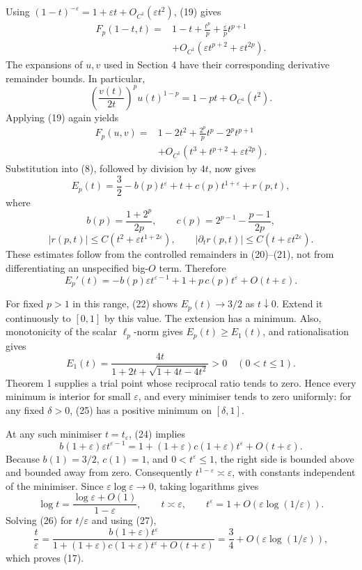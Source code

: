 \documentclass[11pt,a4paper]{article}
\begin{document}
Using \((1-t)^{-\varepsilon}=1+\varepsilon t+O_{C^1}(\varepsilon t^2)\), (19) gives \[
\begin{split}
F_p(1-t,t)
={}&1-t+\frac{t^p}p+\frac{\varepsilon}p t^{p+1}\\
&+O_{C^1}(\varepsilon t^{p+2}+\varepsilon t^{2p}).
\end{split} \tag{20}
\] The expansions of \(u,v\) used in Section 4 have their corresponding derivative remainder bounds. In particular, \[
\left(\frac{v(t)}{2t}\right)^p u(t)^{1-p}
=1-pt+O_{C^1}(t^2).
\] Applying (19) again yields \[
\begin{split}
F_p(u,v)
={}&1-2t^2+\frac{2^p}p t^p-2^p t^{p+1}\\
&+O_{C^1}(t^3+t^{p+2}+\varepsilon t^{2p}).
\end{split} \tag{21}
\] Substitution into (8), followed by division by \(4t\), now gives \[
E_p(t)=\frac32-b(p)t^\varepsilon+t+c(p)t^{1+\varepsilon}+r(p,t), \tag{22}
\] where \[
b(p)=\frac{1+2^p}{2p},\qquad c(p)=2^{p-1}-\frac{p-1}{2p},
\] \[
|r(p,t)|\le C(t^2+\varepsilon t^{1+2\varepsilon}),\qquad
|\partial_t r(p,t)|\le C(t+\varepsilon t^{2\varepsilon}). \tag{23}
\] These estimates follow from the controlled remainders in (20)--(21), not from differentiating an unspecified big-\(O\) term. Therefore \[
E_p'(t)=-b(p)\varepsilon t^{\varepsilon-1}
+1+p\,c(p)t^\varepsilon+O(t+\varepsilon). \tag{24}
\]

For fixed \(p>1\) in this range, (22) shows \(E_p(t)\to3/2\) as \(t\downarrow0\). Extend it continuously to \([0,1]\) by this value. The extension has a minimum. Also, monotonicity of the scalar \(\ell_p\)-norm gives \(E_p(t)\ge E_1(t)\), and rationalisation gives \[
E_1(t)=\frac{4t}{1+2t+\sqrt{1+4t-4t^2}}>0\quad(0<t\le1). \tag{25}
\] Theorem 1 supplies a trial point whose reciprocal ratio tends to zero. Hence every minimum is interior for small \(\varepsilon\), and every minimiser tends to zero uniformly: for any fixed \(\delta>0\), (25) has a positive minimum on \([\delta,1]\).

At any such minimiser \(t=t_\varepsilon\), (24) implies \[
b(1+\varepsilon)\varepsilon t^{\varepsilon-1}
=1+(1+\varepsilon)c(1+\varepsilon)t^\varepsilon+O(t+\varepsilon). \tag{26}
\] Because \(b(1)=3/2\), \(c(1)=1\), and \(0<t^\varepsilon\le1\), the right side is bounded above and bounded away from zero. Consequently \(t^{1-\varepsilon}\asymp\varepsilon\), with constants independent of the minimiser. Since \(\varepsilon\log\varepsilon\to0\), taking logarithms gives \[
\log t=\frac{\log\varepsilon+O(1)}{1-\varepsilon},\qquad
t\asymp\varepsilon,\qquad
t^\varepsilon=1+O(\varepsilon\log(1/\varepsilon)). \tag{27}
\] Solving (26) for \(t/\varepsilon\) and using (27), \[
\frac{t}{\varepsilon}
=\frac{b(1+\varepsilon)t^\varepsilon}
{1+(1+\varepsilon)c(1+\varepsilon)t^\varepsilon+O(t+\varepsilon)}
=\frac34+O(\varepsilon\log(1/\varepsilon)),
\] which proves (17).
\end{document}
